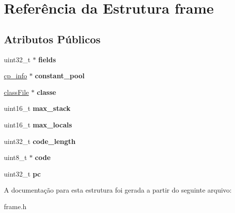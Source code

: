\hypertarget{structframe}{\section{Referência da Estrutura frame}
\label{structframe}
}
\subsection*{Atributos Públicos}
\begin{DoxyCompactItemize}
\item 
\hypertarget{structframe_a96e5a755ca29b9d32e1367a3e063b30c}{uint32\-\_\-t $\ast$ {\bfseries fields}}\label{structframe_a96e5a755ca29b9d32e1367a3e063b30c}

\item 
\hypertarget{structframe_a235ada376a4af8a566332ad046c92f83}{\hyperlink{structcp__info}{cp\-\_\-info} $\ast$ {\bfseries constant\-\_\-pool}}\label{structframe_a235ada376a4af8a566332ad046c92f83}

\item 
\hypertarget{structframe_aee64828d070d3ae688dd8e09948e989c}{\hyperlink{structClassFile}{class\-File} $\ast$ {\bfseries classe}}\label{structframe_aee64828d070d3ae688dd8e09948e989c}

\item 
\hypertarget{structframe_a21004a70deb96c08f1dd6fd30f610b51}{uint16\-\_\-t {\bfseries max\-\_\-stack}}\label{structframe_a21004a70deb96c08f1dd6fd30f610b51}

\item 
\hypertarget{structframe_afff6c0343d82c67273a7c92f582f7ba8}{uint16\-\_\-t {\bfseries max\-\_\-locals}}\label{structframe_afff6c0343d82c67273a7c92f582f7ba8}

\item 
\hypertarget{structframe_a2a43626ab33a7b6ed584eb7a47fc93e8}{uint32\-\_\-t {\bfseries code\-\_\-length}}\label{structframe_a2a43626ab33a7b6ed584eb7a47fc93e8}

\item 
\hypertarget{structframe_a248713b5b9384b4d3edd365ee82625b4}{uint8\-\_\-t $\ast$ {\bfseries code}}\label{structframe_a248713b5b9384b4d3edd365ee82625b4}

\item 
\hypertarget{structframe_a5915ace0f09c12110a4571ac827baf44}{uint32\-\_\-t {\bfseries pc}}\label{structframe_a5915ace0f09c12110a4571ac827baf44}

\end{DoxyCompactItemize}


A documentação para esta estrutura foi gerada a partir do seguinte arquivo\-:\begin{DoxyCompactItemize}
\item 
frame.\-h\end{DoxyCompactItemize}
